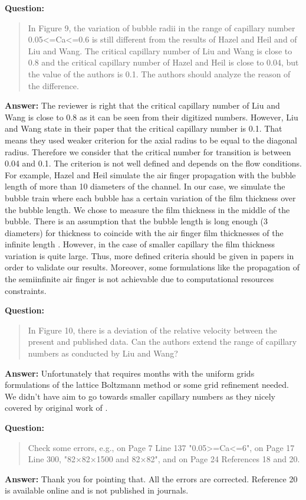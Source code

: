 \documentclass{article}
\begin{document}
\textbf{Question:}
\begin{quotation}
In Figure 9, the variation of bubble radii in the range of capillary number 0.05<=Ca<=0.6 is
still different from the results of Hazel and Heil and of Liu and Wang. The critical capillary
number of Liu and Wang is close to 0.8 and the critical capillary number of Hazel and Heil is close
to 0.04, but the value of the authors is 0.1. The authors should analyze the reason of the
difference.
\end{quotation}
\textbf{Answer:} The reviewer is right that the critical capillary number of Liu and Wang is close
to 0.8 as it can be seen from their digitized numbers. However, Liu and Wang state in their paper
that the critical capillary number is 0.1. That means they used weaker criterion for the axial
radius to be equal to the diagonal radius. Therefore we consider that the critical number for
transition is between 0.04 and 0.1. The criterion is not well defined and depends on the flow
conditions. For example, Hazel and Heil simulate the air finger propagation with the bubble length
of more than 10 diameters of the channel. In our case, we simulate the bubble train where each
bubble has a certain variation of the film thickness over the bubble length. We chose to measure the
film thickness in the middle of the bubble. There is an assumption that the bubble length is long
enough (3 diameters) for thickness to coincide with the air finger film thicknesses of the infinite
length \cite{cerro-space}. However, in the case of smaller capillary the film thickness variation
is quite large. Thus, more defined criteria should be given in papers in order to validate our
results. Moreover, some formulations like the propagation of the semiinfinite air finger is not
achievable due to computational resources constraints.

\textbf{Question:}
\begin{quotation}
In Figure 10, there is a deviation of the relative velocity between the present and published data.
Can the authors extend the range of capillary numbers as conducted by Liu and Wang?
\end{quotation}
\textbf{Answer:} Unfortunately that requires months with the uniform grids formulations of the
lattice Boltzmann method or some grid refinement needed. We didn't have aim to go towards smaller
capillary numbers as they nicely covered by original work of \citet{bretherton}.

\textbf{Question:}
\begin{quotation}
Check some errors, e.g., on Page 7 Line 137 "0.05>=Ca<=6", on Page 17 Line 300, "82×82×1500 and
82×82", and on Page 24 References 18 and 20.
\end{quotation}
\textbf{Answer:} Thank you for pointing that. All the errors are corrected. Reference 20 is
available online and is not published in journals.
\end{document}
